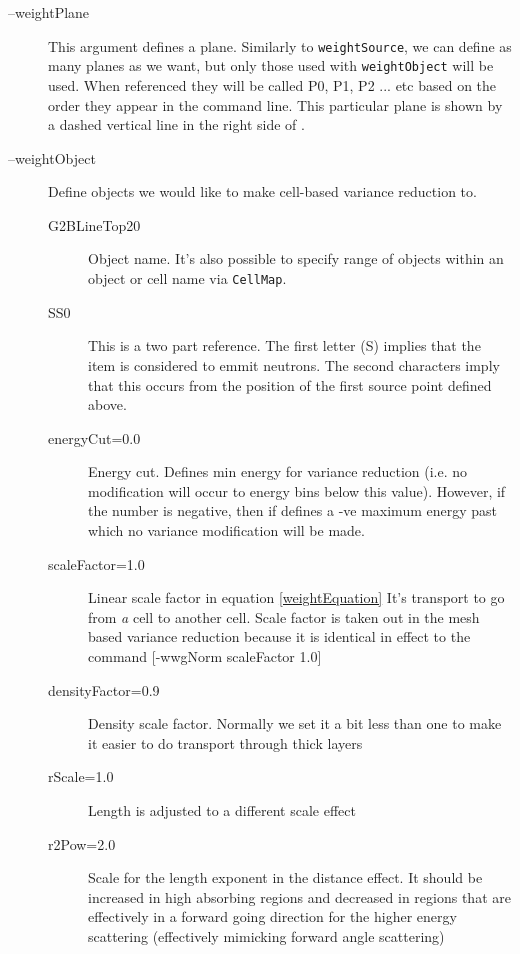 \begin{description}
\item[--weightPlane] This argument defines a plane. Similarly to {\tt weightSource}, we can define as many planes as we want,
  but only those used with {\tt weightObject} will be used.
  When referenced they will be called P0, P1, P2 ... etc based on the order they appear in the command line.
  This particular plane is shown by a dashed vertical line in the right side of .
  
\item[--weightObject] Define objects we would like to make cell-based variance reduction to.
  \begin{description}
  \item[G2BLineTop20] Object name. It's also possible to specify range of objects within an object or cell name via
    {\tt CellMap}.
  \item[SS0] This is a two part reference. The first letter (S) implies that the item is considered to emmit neutrons.
    The second characters imply that this occurs from the position of the first source point defined above.

  \item[energyCut=0.0] Energy cut. Defines min energy for variance reduction
    (i.e. no modification will occur to energy bins below this value). However, if the number is negative, then
    if defines a -ve maximum energy past which no variance modification will be made.

  \item[scaleFactor=1.0] Linear scale factor in equation \ref{weightEquation}
    It's transport to go from {\em a} cell to another cell.
    \alert{Scale factor is taken out in the mesh based variance reduction because it is identical in effect to the
      command [-wwgNorm scaleFactor 1.0] }

  \item[densityFactor=0.9] Density scale factor. Normally we set it a bit less than one to make it easier to do transport through thick layers
    
  \item[rScale=1.0] Length is adjusted to a different scale effect
    
  \item[r2Pow=2.0] Scale for the length exponent in the distance effect. It should be increased in high absorbing
    regions and decreased in regions that are effectively in a forward going direction for the higher energy scattering
    (effectively mimicking forward angle scattering)
    

\end{description}
\end{description}
